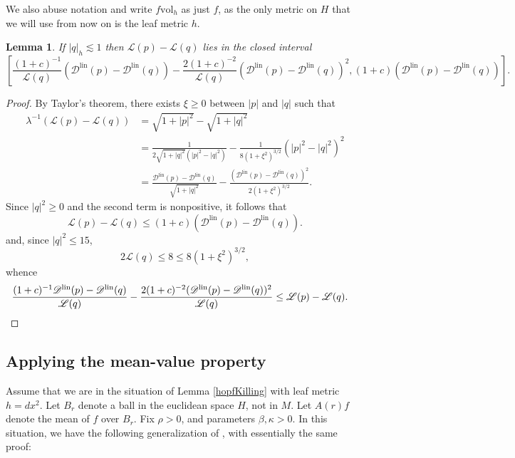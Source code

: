 \documentclass[reqno,12pt,letterpaper]{amsart}
\newcommand{\Lagrange}{\mathscr L}
\newcommand{\DirL}{\mathscr D^{\mathrm{lin}}}
\newcommand{\vol}{\mathrm{vol}}
\newtheorem{lemma}[theorem]{Lemma}
\theoremstyle{definition}
\numberwithin{equation}{section}
\begin{document}
We also abuse notation and write $f\vol_h$ as just $f$, as the only metric on $H$ that we will use from now on is the leaf metric $h$.

\begin{lemma}\label{Taylor lemma}
If $|q|_h \lesssim 1$ then $\Lagrange(p) - \Lagrange(q)$ lies in the closed interval
$$\left[\frac{(1 + c)^{-1}}{\Lagrange(q)}(\DirL(p) - \DirL(q)) - \frac{2(1 + c)^{-2}}{\Lagrange(q)}(\DirL(p) - \DirL(q))^2, (1 + c)(\DirL(p) - \DirL(q))\right].$$
\end{lemma}
\begin{proof}
By Taylor's theorem, there exists $\xi \geq 0$ between $|p|$ and $|q|$ such that
\begin{align*}
\lambda^{-1}(\Lagrange(p) - \Lagrange(q)) &= \sqrt{1 + |p|^2} - \sqrt{1 + |q|^2}\\
&= \frac{1}{2 \sqrt{1 + |q|^2}(|p|^2 - |q|^2)} - \frac{1}{8(1 + \xi^2)^{3/2}}(|p|^2 - |q|^2)^2 \\
&= \frac{\DirL(p) - \DirL(q)}{\sqrt{1 + |q|^2}} - \frac{(\DirL(p) - \DirL(q))^2}{2(1 + \xi^2)^{3/2}}.
\end{align*}
Since $|q|^2 \geq 0$ and the second term is nonpositive, it follows that
$$\Lagrange(p) - \Lagrange(q) \leq (1 + c)(\DirL(p) - \DirL(q)).$$
and, since $|q|^2 \leq 15$,
$$2\Lagrange(q) \leq 8 \leq 8(1 + \xi^2)^{3/2},$$
whence
\begin{align*}
\frac{(1 + c)^{-1}\DirL(p) - \DirL(q)}{\Lagrange(q)} - \frac{2(1 + c)^{-2}(\DirL(p) - \DirL(q))^2}{\Lagrange(q)} &\leq \Lagrange(p) - \Lagrange(q).\qedhere
\end{align*}
\end{proof}

\subsection{Applying the mean-value property}
Assume that we are in the situation of Lemma \ref{hopfKilling} with leaf metric $h = dx^2$.
Let $B_r$ denote a ball in the euclidean space $H$, not in $M$.
Let $A(r)f$ denote the mean of $f$ over $B_r$.
Fix $\rho > 0$, and parameters $\beta, \kappa > 0$.
In this situation, we have the following generalization of \cite[Teorema 4.3]{Miranda66}, with essentially the same proof:
\end{document}
